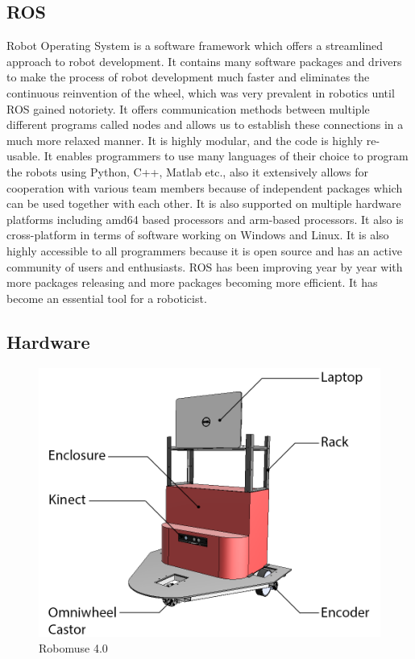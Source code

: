 \documentclass[12pt]{article}
\begin{document}
\subsection{ROS}
Robot Operating System is a software framework which offers a streamlined approach to robot development. It contains many software packages and drivers to make the process of robot development much faster and eliminates the continuous reinvention of the wheel, which was very prevalent in robotics until ROS gained notoriety. It offers communication methods between multiple different programs called nodes and allows us to establish these connections in a much more relaxed manner. It is highly modular, and the code is highly re-usable. It enables programmers to use many languages of their choice to program the robots using Python, C++, Matlab etc., also it extensively allows for cooperation with various team members because of independent packages which can be used together with each other. It is also supported on multiple hardware platforms including amd64 based processors and arm-based processors. It also is cross-platform in terms of software working on Windows and Linux. It is also highly accessible to all programmers because it is open source and has an active community of users and enthusiasts. ROS has been improving year by year with more packages releasing and more packages becoming more efficient. It has become an essential tool for a roboticist.
\newpage
\subsection{Hardware}

\begin{figure}[H]
\centering
\includegraphics[scale=0.2]{Robot.png}
\caption{Robomuse 4.0 }
\end{figure}
\end{document}
